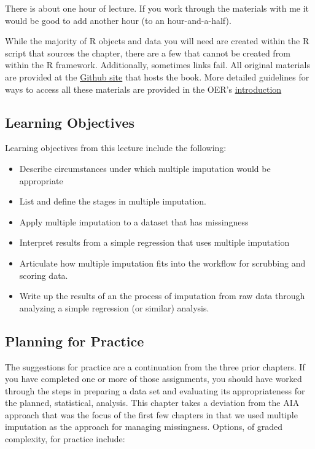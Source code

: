 \documentclass[
  11pt,
]{book}
\providecommand{\tightlist}{%
  \setlength{\itemsep}{0pt}\setlength{\parskip}{0pt}}
\begin{document}
There is about one hour of lecture. If you work through the materials with me it would be good to add another hour (to an hour-and-a-half).

While the majority of R objects and data you will need are created within the R script that sources the chapter, there are a few that cannot be created from within the R framework. Additionally, sometimes links fail. All original materials are provided at the \href{https://github.com/lhbikos/ReC_MultivModel}{Github site} that hosts the book. More detailed guidelines for ways to access all these materials are provided in the OER's \protect\hyperlink{ReCintro}{introduction}

\hypertarget{learning-objectives-3}{%
\subsection{Learning Objectives}\label{learning-objectives-3}}

Learning objectives from this lecture include the following:

\begin{itemize}
\tightlist
\item
  Describe circumstances under which multiple imputation would be appropriate
\item
  List and define the stages in multiple imputation.
\item
  Apply multiple imputation to a dataset that has missingness
\item
  Interpret results from a simple regression that uses multiple imputation
\item
  Articulate how multiple imputation fits into the workflow for scrubbing and scoring data.
\item
  Write up the results of an the process of imputation from raw data through analyzing a simple regression (or similar) analysis.
\end{itemize}

\hypertarget{planning-for-practice-3}{%
\subsection{Planning for Practice}\label{planning-for-practice-3}}

The suggestions for practice are a continuation from the three prior chapters. If you have completed one or more of those assignments, you should have worked through the steps in preparing a data set and evaluating its appropriateness for the planned, statistical, analysis. This chapter takes a deviation from the AIA \citep{parent_handling_2013} approach that was the focus of the first few chapters in that we used multiple imputation as the approach for managing missingness. Options, of graded complexity, for practice include:
\end{document}
